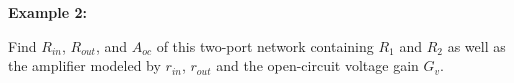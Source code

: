 \documentclass{article}
\begin{document}
\begin{itemize}
\begin{comment}
  \item {\bf Current gain $G_I$:} defined as the ratio of the output 
    current to the input current:
    \begin{equation}
      G_I=\frac{i_{out}}{i_{in}}=\frac{A v_{in}/(r_{out}+R_L)}{i_{in}}
      =\frac{A r_{in}i_{in}/(r_{out}+R_L)}{i_{in}}
      =\frac{A r_{in}}{r_{out}+R_L}
    \end{equation}
    Ideally, when $r_{in}=\infty$, $r_{out}=0$, we have $G_I=\infty$.

  \item {\bf Power gain $G_P$: } defined as the ratio of the power 
    delivered to the load to that to the amplifier:
    \begin{equation}
      G_P=\frac{v_{out}^2/R_L}{v_{in}^2/r_{in}}=G_V^2 \frac{r_{in}}{R_L} 
    \end{equation}
  \end{itemize}
  \end{comment}

\end{itemize}

{\bf Example 2:} 


Find $R_{in}$, $R_{out}$, and $A_{oc}$ of this two-port network containing
$R_1$ and $R_2$ as well as the amplifier modeled by $r_{in}$, $r_{out}$ 
and the open-circuit voltage gain $G_v$. 
\end{document}
